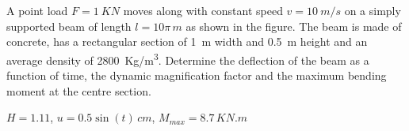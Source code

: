 
\begin{Exercise}[label={moving_load}]
A point load $F=\SI{1}{KN}$ moves along with constant speed $v=\SI{10}{m/s}$ on a simply supported beam of length $l=10\pi\,\si{m}$ as shown in the figure. The beam is made of concrete, has a rectangular section of \qty{1}{m} width and \qty{0.5}{m} height and an average density of \qty{2800}{Kg/m^3}. Determine the deflection of the beam as a function of time, the dynamic magnification factor and the maximum bending moment at the centre section.

\begin{center}
\end{center}

\shortAnswer $H=1.11$, $u=0.5\sin(t)\,\si{cm}$, $M_{max} = 8.7\,\si{KN.m}$
\end{Exercise}



